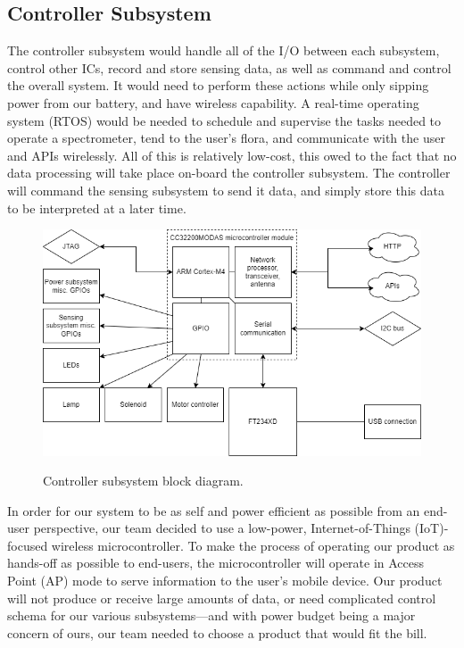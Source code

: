 \documentclass[journal]{IEEEtran}
\begin{document}
\subsection{Controller Subsystem}
The controller subsystem would handle all of the I/O between each subsystem, control other ICs, record and store sensing data, as well as command and control the overall system. It would need to perform these actions while only sipping power from our battery, and have wireless capability. A real-time operating system (RTOS) would be needed to schedule and supervise the tasks needed to operate a spectrometer, tend to the user's flora, and communicate with the user and APIs wirelessly. All of this is relatively low-cost, this owed to the fact that no data processing will take place on-board the controller subsystem. The controller will command the sensing subsystem to send it data, and simply store this data to be interpreted at a later time.

\begin{figure}[H]
   \centering
   \includegraphics[width=\linewidth]{images/control-block-diagram.png}
   \label{fig:control-block-diagram}
   \caption{Controller subsystem block diagram.}
\end{figure}

In order for our system to be as self and power efficient as possible from an end-user perspective, our team decided to use a low-power, Internet-of-Things (IoT)-focused wireless microcontroller. To make the process of operating our product as hands-off as possible to end-users, the microcontroller will operate in Access Point (AP) mode to serve information to the user's mobile device. Our product will not produce or receive large amounts of data, or need complicated control schema for our various subsystems---and with power budget being a major concern of ours, our team needed to choose a product that would fit the bill.
\end{document}

